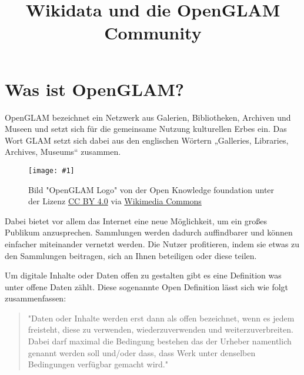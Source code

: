 \documentclass{article}
\newlength{\imgwidth}
\newcommand\scaledgraphics[2]{%
                
\settowidth{\imgwidth}{\texttt{[image: \#1]}}%
                
\setlength{\imgwidth}{\minof{\imgwidth}{#2\textwidth}}%
                
\texttt{[image: \#1]}%
                
}
\begin{document}
\title{Wikidata und die OpenGLAM Community}

\maketitle





\section{Was ist OpenGLAM?}\label{H9507990}



OpenGLAM bezeichnet ein Netzwerk aus Galerien, Bibliotheken, Archiven und Museen und setzt sich für die gemeinsame Nutzung kulturellen Erbes ein. Das Wort GLAM setzt sich dabei aus den englischen Wörtern „Galleries, Libraries, Archives, Museums“ zusammen.

\begin{figure}
\scaledgraphics{ce15208f-6cbe-4d4f-a6eb-ffd2e7f8fb24.png}{1}
\caption*{Bild "OpenGLAM Logo" von der Open Knowledge foundation unter der Lizenz \href{https://creativecommons.org/licenses/by/4.0/deed.de}{CC BY 4.0} via \href{https://https://commons.wikimedia.org/wiki/File:OpenGLAM_Logo.svg}{Wikimedia Commons}}\label{F81154591}
\end{figure}





Dabei bietet vor allem das Internet eine neue Möglichkeit, um ein großes Publikum anzusprechen. Sammlungen werden dadurch auffindbarer und können einfacher miteinander vernetzt werden. Die Nutzer profitieren, indem sie etwas zu den Sammlungen beitragen, sich an Ihnen beteiligen oder diese teilen.


Um digitale Inhalte oder Daten offen zu gestalten gibt es eine Definition was unter offene Daten zählt. Diese sogenannte Open Definition lässt sich wie folgt zusammenfassen:

\begin{quote}



"Daten oder Inhalte werden erst dann als offen bezeichnet, wenn es jedem freisteht, diese zu verwenden, wiederzuverwenden und weiterzuverbreiten. Dabei darf maximal die Bedingung bestehen das der Urheber namentlich genannt werden soll und/oder dass, dass Werk unter denselben Bedingungen verfügbar gemacht wird."


\end{quote}
\end{document}
